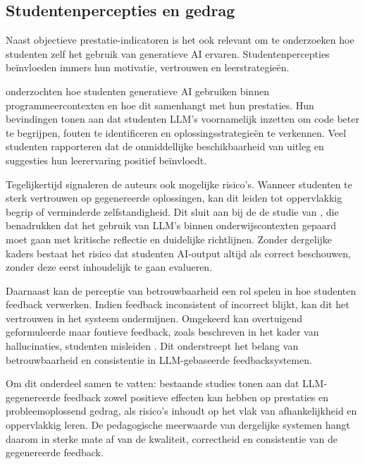 \subsection{Studentenpercepties en gedrag}

Naast objectieve prestatie-indicatoren is het ook relevant om te onderzoeken hoe studenten zelf het gebruik van generatieve AI ervaren. Studentenpercepties beïnvloeden immers hun motivatie, vertrouwen en leerstrategieën.

\vspace{1em}

\textcite{Lepp2025} onderzochten hoe studenten generatieve AI gebruiken binnen programmeercontexten en hoe dit samenhangt met hun prestaties. Hun bevindingen tonen aan dat studenten LLM’s voornamelijk inzetten om code beter te begrijpen, fouten te identificeren en oplossingsstrategieën te verkennen. Veel studenten rapporteren dat de onmiddellijke beschikbaarheid van uitleg en suggesties hun leerervaring positief beïnvloedt.

\vspace{1em}

Tegelijkertijd signaleren de auteurs ook mogelijke risico’s. Wanneer studenten te sterk vertrouwen op gegenereerde oplossingen, kan dit leiden tot oppervlakkig begrip of verminderde zelfstandigheid. Dit sluit aan bij de de studie van \textcite{Kasneci2023}, die benadrukken dat het gebruik van LLM’s binnen onderwijscontexten gepaard moet gaan met kritische reflectie en duidelijke richtlijnen. Zonder dergelijke kaders bestaat het risico dat studenten AI-output altijd als correct beschouwen, zonder deze eerst inhoudelijk te gaan evalueren.

\vspace{1em}

Daarnaast kan de perceptie van betrouwbaarheid een rol spelen in hoe studenten feedback verwerken. Indien feedback inconsistent of incorrect blijkt, kan dit het vertrouwen in het systeem ondermijnen. Omgekeerd kan overtuigend geformuleerde maar foutieve feedback, zoals beschreven in het kader van hallucinaties, studenten misleiden \autocite{Kasneci2023}. Dit onderstreept het belang van betrouwbaarheid en consistentie in LLM-gebaseerde feedbacksystemen.

\vspace{1em}

Om dit onderdeel samen te vatten: bestaande studies tonen aan dat LLM-gegenereerde feedback zowel positieve effecten kan hebben op prestaties en probleemoplossend gedrag, als risico’s inhoudt op het vlak van afhankelijkheid en oppervlakkig leren. De pedagogische meerwaarde van dergelijke systemen hangt daarom in sterke mate af van de kwaliteit, correctheid en consistentie van de gegenereerde feedback.

